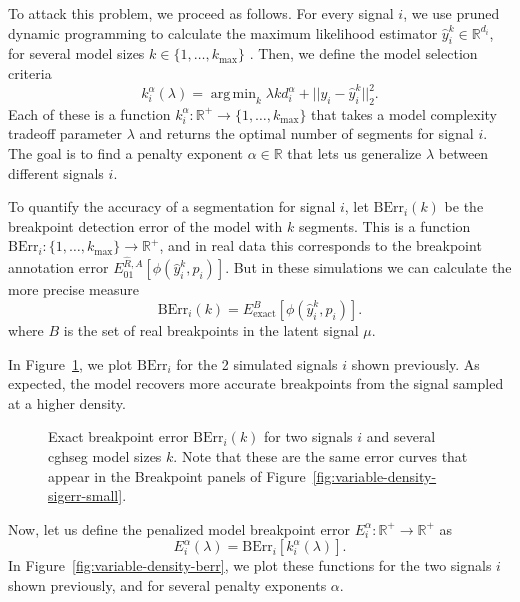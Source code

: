 \documentclass{jsfds} %
\newcommand{\fig}[3][H]{
  \begin{figure}[#1]
    \hskip -1cm
    
    \caption{#3}
    \label{fig:#2}
  \end{figure}
}
\DeclareMathOperator*{\argmin}{arg\,min}
\newcommand{\RR}{\mathbb{R}}
\begin{document}
To attack this problem, we proceed as follows. For every signal $i$,
we use pruned dynamic programming to calculate the maximum likelihood
estimator $\hat y^k_i\in\RR^{d_i}$, for several model sizes
$k\in\{1,\dots,k_{\text{max}}\}$ \citep{pruned-dp}. Then, we define
the model selection criteria
\begin{equation}
  \label{eq:kstar_density}
  k^\alpha_i(\lambda) =\argmin_k \lambda k d_i^\alpha + 
  ||y_i-\hat y^k_i||_2^2.
\end{equation}
Each of these is a function $k_i^\alpha:\RR^+\rightarrow
\{1,\dots,k_{\text{max}}\}$ that takes a model complexity tradeoff
parameter $\lambda$ and returns the optimal number of segments for
signal $i$. The goal is to find a penalty exponent $\alpha\in\RR$ that
lets us generalize $\lambda$ between different signals $i$.


To quantify the accuracy of a segmentation for signal $i$, let
$\text{BErr}_i(k)$ be the breakpoint detection error of the model with
$k$ segments. This is a function
$\text{BErr}_i:\{1,\dots,k_{\text{max}}\}\rightarrow\RR^+$, and in
real data this corresponds to the breakpoint annotation error
$E_{01}^{\hat R,A}\left[\phi(\hat y^k_i,p_i)\right]$. But in
these simulations we can calculate the more precise measure
\begin{equation}
  \label{eq:berr}
  \text{BErr}_i(k) = E_{\text{exact}}^{B}\left[
\phi(\hat y_i^k,p_i)
\right].
\end{equation}
where $B$ is the set of real breakpoints in the latent
signal $\mu$.

In Figure~\ref{fig:variable-density-berr-k}, we plot $\text{BErr}_i$
for the 2 simulated signals $i$ shown previously.  As expected, the
model recovers more accurate breakpoints from the signal sampled at a
higher density.  

\fig{variable-density-berr-k}{Exact breakpoint error
  $\text{BErr}_i(k)$ for two signals $i$ and several cghseg model
  sizes $k$. Note that these are the same error curves that appear
in the Breakpoint panels of Figure~\ref{fig:variable-density-sigerr-small}.}

\newpage

Now, let us define the penalized
model breakpoint error $E^\alpha_i:\RR^+\rightarrow\RR^+$ as
\begin{equation}
  \label{eq:lerr}
E^\alpha_i(\lambda) = \text{BErr}_i\left[
k^\alpha_i(\lambda)
\right].
\end{equation}
In Figure~\ref{fig:variable-density-berr}, we plot these functions for the
two signals $i$ shown previously, and for several penalty exponents $\alpha$.
\end{document}
